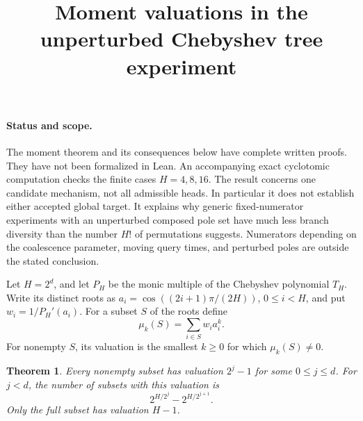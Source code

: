 \documentclass[11pt]{article}
\title{Moment valuations in the unperturbed Chebyshev tree experiment}
\author{}
\date{}
\newtheorem{theorem}{Theorem}
\begin{document}
\maketitle

\paragraph{Status and scope.}
The moment theorem and its consequences below have complete written
proofs. They have not been formalized in Lean. An accompanying exact
cyclotomic computation checks the finite cases $H=4,8,16$.
The result concerns one candidate mechanism, not all admissible heads.
In particular it does not establish either accepted global target.
It explains why generic fixed-numerator experiments with an unperturbed
composed pole set have much less branch diversity than the number $H!$
of permutations suggests. Numerators depending on the coalescence
parameter, moving query times, and perturbed poles are outside the
stated conclusion.

Let $H=2^d$, and let $P_H$ be the monic multiple of the Chebyshev
polynomial $T_H$. Write its distinct roots as
$a_i=\cos((2i+1)\pi/(2H))$, $0\leq i<H$, and put
$w_i=1/P_H'(a_i)$. For a subset $S$ of the roots define
\[
 \mu_k(S)=\sum_{i\in S}w_i a_i^k.
\]
For nonempty $S$, its valuation is the smallest $k\geq0$ for which
$\mu_k(S)\ne0$.

\begin{theorem}
Every nonempty subset has valuation $2^j-1$ for some $0\leq j\leq d$.
For $j<d$, the number of subsets with this valuation is
\[
 2^{H/2^j}-2^{H/2^{j+1}}.
\]
Only the full subset has valuation $H-1$.
\end{theorem}
\end{document}
